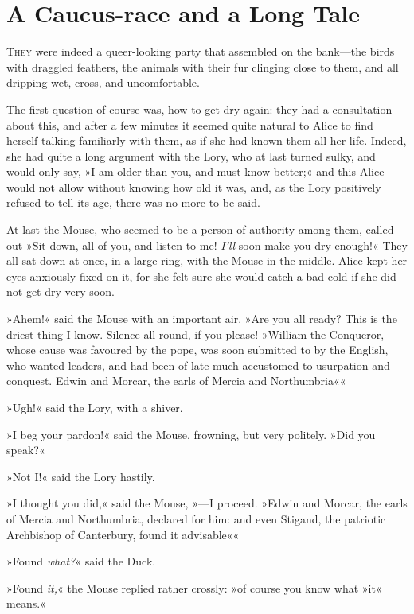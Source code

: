 \chapter{A Caucus-race and a Long Tale}
	
\lettrine[lines=4,findent=2pt]{T}{hey} were indeed a queer-looking party that assembled on the bank—the birds with draggled feathers, the animals with their fur clinging close to them, and all dripping wet, cross, and uncomfortable.
	
The first question of course was, how to get dry again: they had a consultation about this, and after a few minutes it seemed quite natural to Alice to find herself talking familiarly with them, as if she had known them all her life. Indeed, she had quite a long argument with the Lory, who at last turned sulky, and would only say, »I am older than you, and must know better;« and this Alice would not allow without knowing how old it was, and, as the Lory positively refused to tell its age, there was no more to be said.

At last the Mouse, who seemed to be a person of authority among them, called out »Sit down, all of you, and listen to me! \textit{I'll} soon make you dry enough!« They all sat down at once, in a large ring, with the Mouse in the middle. Alice kept her eyes anxiously fixed on it, for she felt sure she would catch a bad cold if she did not get dry very soon.

»Ahem!« said the Mouse with an important air. »Are you all ready? This is the driest thing I know. Silence all round, if you please! »William the Conqueror, whose cause was favoured by the pope, was soon submitted to by the English, who wanted leaders, and had been of late much accustomed to usurpation and conquest. Edwin and Morcar, the earls of Mercia and Northumbria\longdash««

»Ugh!« said the Lory, with a shiver.

»I beg your pardon!« said the Mouse, frowning, but very politely. »Did you speak?«

»Not I\@!« said the Lory hastily.

»I thought you did,« said the Mouse, »—I proceed. »Edwin and Morcar, the earls of Mercia and Northumbria, declared for him: and even Stigand, the patriotic Archbishop of Canterbury, found it advisable\longdash««

»Found \textit{what?}« said the Duck.

»Found \textit{it,}« the Mouse replied rather crossly: »of course you know what »it« means.«

